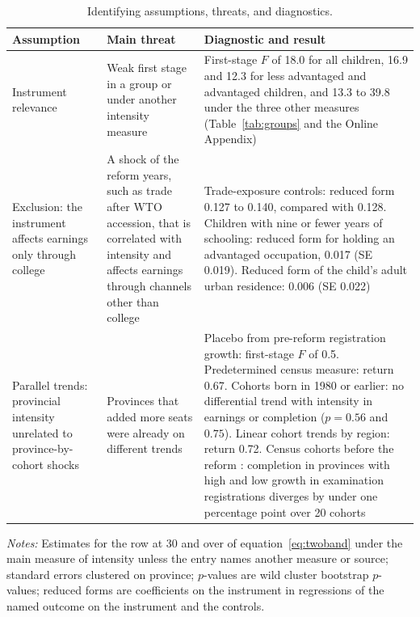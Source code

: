 \documentclass[11pt]{article}
\begin{document}
\begin{table}[t]
\centering
\footnotesize
\caption{Identifying assumptions, threats, and diagnostics.}
\label{tab:threats}
\begin{tabular}{@{}L{2.8cm}L{3.9cm}L{8.0cm}@{}}
\toprule
Assumption & Main threat & Diagnostic and result \\
\midrule
Instrument relevance & Weak first stage in a group or under another intensity measure
& First-stage $F$ of 18.0 for all children, 16.9 and 12.3 for less advantaged and advantaged children, and 13.3 to 39.8 under the three other measures (Table~\ref{tab:groups} and the Online Appendix) \\
\addlinespace
Exclusion: the instrument affects earnings only through college & A shock of the reform years, such as trade after WTO accession, that is correlated with intensity and affects earnings through channels other than college &
Trade-exposure controls: reduced form 0.127 to 0.140, compared with 0.128. Children with nine or fewer years of schooling: reduced form for holding an advantaged occupation, 0.017 (SE 0.019). Reduced form of the child's adult urban residence: 0.006 (SE 0.022) \\
\addlinespace
Parallel trends: provincial intensity unrelated to province-by-cohort shocks & Provinces that added more seats were already on different trends &
Placebo from pre-reform registration growth: first-stage $F$ of 0.5. Predetermined census measure: return 0.67. Cohorts born in 1980 or earlier: no differential trend with intensity in earnings or completion ($p = 0.56$ and $0.75$). Linear cohort trends by region: return 0.72. Census cohorts before the reform \citep{IPUMSInternational}: completion in provinces with high and low growth in examination registrations diverges by under one percentage point over 20 cohorts \\
\bottomrule
\end{tabular}
\par\smallskip
\begin{minipage}{0.95\textwidth}
\footnotesize\emph{Notes:} Estimates for the row at 30 and over of equation~\eqref{eq:twoband} under the main measure of intensity unless the entry names another measure or source; standard errors clustered on province; $p$-values are wild cluster bootstrap $p$-values; reduced forms are coefficients on the instrument in regressions of the named outcome on the instrument and the controls.
\end{minipage}
\end{table}
\end{document}
